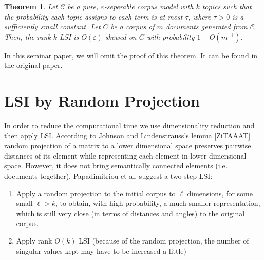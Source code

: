 \documentclass[a4paper,11pt,DIV=15]{scrartcl} %
\renewcommand{\epsilon}{\varepsilon}
\theoremstyle{plain}
\newtheorem{theorem}{Theorem}
\theoremstyle{definition}
\begin{document}
\begin{theorem}
    Let $\mathscr{C}$ be a pure, $\epsilon$-seperable corpus model with $k$ topics such that the probability each topic assigns to each term is at most $\tau$, where $\tau > 0$ is a sufficiently small constant. Let $C$ be a corpus of $m$ documents generated from $\mathscr{C}$. Then, the rank-$k$ LSI is $O(\epsilon)$-skewed on $C$ with probability $1-O(m^{-1})$.
\end{theorem}

In this seminar paper, we will omit the proof of this theorem. It can be found in the original paper.







\section{LSI by Random Projection} %
In order to reduce the computational time we use dimensionality reduction and then apply LSI.
According to Johnson and Lindenstrauss's lemma [ZiTAAAT]  random projection of a matrix to a lower dimensional space preserves pairwise distances of its element while representing each element in lower dimensional space. However, it does not bring semantically connected elements (i.e. documents together).  Papadimitriou et al. suggest a two-step LSI:
\begin{enumerate}
    \item  Apply a random projection to the initial corpus to $\ell$ dimensions, for some
small $\ell > k$, to obtain, with high probability, a much smaller representation, which
is still very close (in terms of distances and angles) to the original corpus.

\item Apply rank $O(k)$ LSI (because of the random projection, the number of
singular values kept may have to be increased a little)
\end{enumerate}
\end{document}
